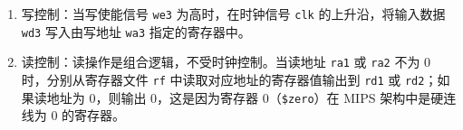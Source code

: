 \begin{enumerate}
    \item 写控制：当写使能信号 \texttt{we3} 为高时，在时钟信号 \texttt{clk} 的上升沿，将输入数据 \texttt{wd3} 写入由写地址 \texttt{wa3} 指定的寄存器中。

    \item 读控制：读操作是组合逻辑，不受时钟控制。当读地址 \texttt{ra1} 或 \texttt{ra2} 不为 0 时，分别从寄存器文件 \texttt{rf} 中读取对应地址的寄存器值输出到 \texttt{rd1} 或 \texttt{rd2}；如果读地址为 0，则输出 0，这是因为寄存器 0（\texttt{\$zero}）在 MIPS 架构中是硬连线为 0 的寄存器。
\end{enumerate}
